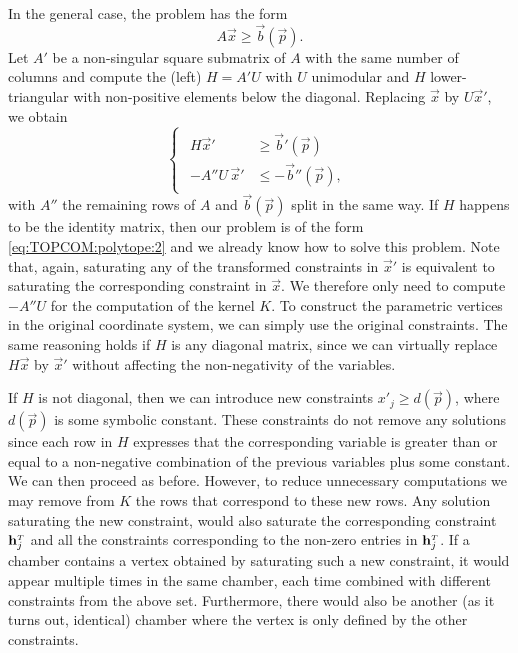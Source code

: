 In the general case, the problem has the form
$$
A \vec x \ge \vec b(\vec p)
.
$$
Let $A'$ be a non-singular square submatrix of $A$ with the same number
of columns and compute the (left)  $H = A' U$ with $U$ unimodular
and $H$ lower-triangular with non-positive elements below the diagonal.
Replacing $\vec x$ by $U \vec x'$, we obtain
$$
\begin{cases}
    \begin{aligned}
H \vec x' &\ge \vec b'(\vec p)
\\
-A''U \, \vec x' &\le -\vec b''(\vec p)
,
    \end{aligned}
\end{cases}
$$
with $A''$ the remaining rows of $A$ and $\vec b(\vec p)$ split
in the same way.
If $H$ happens to be the identity matrix, then our problem is
of the form \eqref{eq:TOPCOM:polytope:2} and we already know how
to solve this problem.
Note that, again, saturating any of the transformed constraints
in $\vec x'$ is equivalent to saturating the corresponding constraint
in $\vec x$.  We therefore only need to compute $-A'' U$ for the
computation of the kernel $K$.  To construct the parametric vertices
in the original coordinate system, we can simply use the original
constraints.
The same reasoning holds if $H$ is any diagonal matrix, since
we can virtually replace $H \vec x$ by $\vec x'$ without affecting
the non-negativity of the variables.

If $H$ is not diagonal, then we can introduce new constraints
$x'_j \ge d(\vec p)$, where $d(\vec p)$ is some symbolic constant.
These constraints do not remove any solutions
since each row in $H$ expresses that the corresponding variable is
greater than or equal to a non-negative combination of the
previous variables plus some constant.
We can then proceed as before.  However, to reduce unnecessary computations
we may remove from $K$ the rows that correspond to these new rows.
Any solution saturating the new constraint, would also saturate
the corresponding constraint $\vec h_j^\T$ and all
the constraints corresponding to the non-zero
entries in $\vec h_j^\T$.
If a chamber contains a vertex obtained by saturating such a new
constraint, it would appear multiple times in the same chamber,
each time combined with different constraints from the above set.
Furthermore, there would also be another (as it turns out, identical)
chamber where the vertex is only defined by the other constraints.


